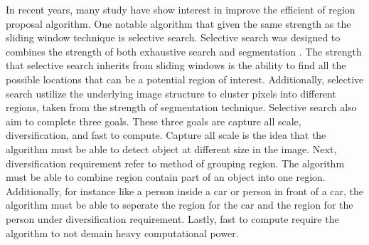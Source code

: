 In recent years, many study have show interest in improve the efficient of region proposal algorithm. One notable algorithm that given the same strength as the sliding window technique is selective search. Selective search was designed to combines the strength of both exhaustive search and segmentation \cite{selective_search_2013}. The strength that selective search inherits from sliding windows is the ability to find all the possible locations that can be a potential region of interest. Additionally, selective search ustilize the underlying image structure to cluster pixels into different regions, taken from the strength of segmentation technique. Selective search also aim to complete three goals. These three goals are capture all scale, diversiﬁcation, and fast to compute. Capture all scale is the idea that the algorithm must be able to detect object at different size in the image. Next, diversiﬁcation requirement refer to method of grouping region. The algorithm must be able to combine region contain part of an object into one region. Additionally, for instance like a person inside a car or person in front of a car, the algorithm must be able to seperate the region for the car and the region for the person under diversiﬁcation requirement. Lastly, fast to compute require the algorithm to not demain heavy computational power.

